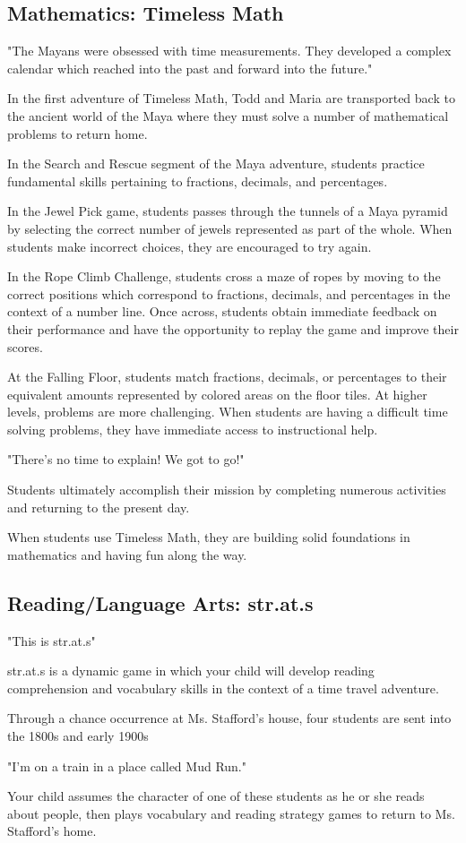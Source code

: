 \subsection{Mathematics: Timeless Math}

"The Mayans were obsessed with time measurements.
They developed a complex calendar which reached into the past and forward into the future."

In the first adventure of Timeless Math, Todd and Maria are transported back to the ancient world of the Maya where they must solve a number of mathematical problems to return home.

In the Search and Rescue segment of the Maya adventure, students practice fundamental skills pertaining to fractions, decimals, and percentages.

In the Jewel Pick game, students passes through the tunnels of a Maya pyramid by selecting the correct number of jewels represented as part of the whole.
When students make incorrect choices, they are encouraged to try again.

In the Rope Climb Challenge, students cross a maze of ropes by moving to the correct positions which correspond to fractions, decimals, and percentages in the context of a number line.
Once across, students obtain immediate feedback on their performance and have the opportunity to replay the game and improve their scores.

At the Falling Floor, students match fractions, decimals, or percentages to their equivalent amounts represented by colored areas on the floor tiles.
At higher levels, problems are more challenging.
When students are having a difficult time solving problems, they have immediate access to instructional help.

"There's no time to explain!
We got to go!"

Students ultimately accomplish their mission by completing numerous activities and returning to the present day.

When students use Timeless Math, they are building solid foundations in mathematics and having fun along the way.

\subsection{Reading/Language Arts: str.at.s}

"This is str.at.s"

str.at.s is a dynamic game in which your child will develop reading comprehension and vocabulary skills in the context of a time travel adventure.

Through a chance occurrence at Ms. Stafford's house, four students are sent into the 1800s and early 1900s

"I'm on a train in a place called Mud Run."

Your child assumes the character of one of these students as he or she reads about people, then plays vocabulary and reading strategy games to return to Ms. Stafford's home.